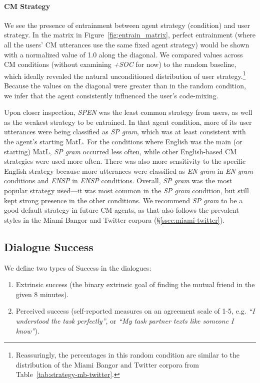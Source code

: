 \documentclass[11pt,a4paper]{article}
\newcommand{\Sref}[1]{\S\ref{#1}}
\newcommand{\Fref}[1]{Figure~\ref{#1}}
\newcommand{\tref}[1]{Table~\ref{#1}}
\begin{document}
\paragraph{CM Strategy}
We see the presence of entrainment between agent strategy (condition) and user strategy.
In the matrix in \Fref{fig:entrain_matrix}, perfect entrainment (where all the users' CM utterances use the same fixed agent strategy) would be shown with a normalized value of 1.0 along the diagonal. 
We compared values across CM conditions (without examining \textit{+SOC} for now) to the random baseline, which ideally revealed the natural unconditioned distribution of user strategy.\footnote{Reassuringly, the percentages in this random condition are similar to the distribution of the Miami Bangor and Twitter corpora from \tref{tab:strategy-mb-twitter}.}
Because the values on the diagonal were greater than in the random condition, we infer that the agent consistently influenced the user's code-mixing.

Upon closer inspection, \textit{SP\textrightarrow EN} was the least common strategy from users, as well as the weakest strategy to be entrained. 
In that agent condition, more of its user utterances were being classified as \textit{SP gram}, which was at least consistent with the agent's starting MatL.
For the conditions where English was the main (or starting) MatL, \textit{SP gram} occurred less often, while other English-based CM strategies were used more often. 
There was also more sensitivity to the specific English strategy because more utterances were classified as \textit{EN gram} in \textit{EN gram} conditions and \textit{EN\textrightarrow SP} in \textit{EN\textrightarrow SP} conditions.
Overall, \textit{SP gram} was the most popular strategy used---it was most common in the \textit{SP gram} condition, but still kept strong presence in the other conditions.
We recommend \textit{SP gram} to be a good default strategy in future CM agents, as that also follows the prevalent styles in the Miami Bangor and Twitter corpora (\Sref{ssec:miami-twitter}).

\subsection{Dialogue Success}

We define two types of Success in the dialogues:

\begin{enumerate}
\item Extrinsic success (the binary extrinsic goal of finding the mutual friend in the given 8 minutes).
\item Perceived success (self-reported measures on an agreement scale of 1-5, e.g. \textit{``I understood the task perfectly''}, or \textit{``My task partner texts like someone I know''}).
\end{enumerate}
\end{document}
